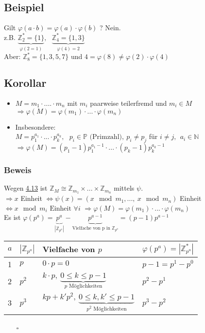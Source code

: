 \documentclass[12pt,titlepage, pdf]{article}
\newcommand{\qed}{\hfill$\square$}
\renewcommand{\>}{\rightarrow}
\renewcommand{\*}{\cdot}
\renewcommand{\phi}{\varphi}
\begin{document}
	\subsection{Beispiel}
	Gilt $\phi (a \cdot b) = \phi(a) \cdot \phi(b)$ ? Nein.\\
	z.B. $\underbrace{\mathds{Z}_2^* = \{1\}}_{\phi(2 = 1)},~~~ \underbrace{\mathds{Z}_4^* = \{1,3\}}_{\phi(4)= 2}$\\
	Aber: $\mathds{Z}_8^* =\{1,3,5,7\}$ und $4 = \phi(8) \neq \phi(2) \cdot \phi(4)$
	\subsection{Korollar}
	\begin{itemize}
		\item$M = m_1 \cdot .... \cdot m_n$ mit $m_i$  paarweise teilerfremd und $m_i \in M$ \\
		$\Rightarrow \phi(M) =\phi(m_1) \cdot ... \cdot \phi(m_n)$
		\item Insbesondere:\\ $M = p_1^{a_1} \cdot... \cdot p_k^{a_k},~~~ p_i \in \mathds{P}\textrm{ (Primzahl)},~ p_i \neq p_j$ für $i \neq j,~~ a_i \in \mathds{N}$\\
		$\Rightarrow \phi(M) = (p_1 - 1)p_1^{a_1 - 1} \cdot ... \cdot (p_k - 1)p_k^{a_k - 1}$
	\end{itemize}
	\subsubsection*{Beweis}
	Wegen \hyperref[4.13]{4.13} ist $\mathds{Z}_M \cong \mathds{Z}_{m_1} \times ... \times \mathds{Z}_{m_n}$ mittels $\psi$.\\
	$\Rightarrow x$ Einheit $\Leftrightarrow \psi(x)=(x\mod m_1,...,~x\mod m_n)$ Einheit\\
	\noindent\hspace*{22mm}$\Leftrightarrow x \mod m_i \text{ Einheit } \forall i$
	$\Rightarrow \phi(M) = \phi(m_1) \cdot ... \cdot \phi(m_n)$\\
	Es ist $\phi(p^a) = \underbrace{p^a}_{|\mathds{Z}_{p^a}|} - \underbrace{p^{a-1}}_{\text{Vielfache von p in }\mathds{Z}_{p^a}} = (p-1)p^{a-1}$ \\
	\begin{tabular}{l | l | l | l }
		$a$ & $|\mathds{Z}_{p^a}|$ & Vielfache von $p$ & $\phi(p^a) = |\mathds{Z}_{p^a}^*|$\\ \hline 
		1 & $p$ & $0 \cdot p = 0$ & $p-1 = p^1 - p^0$ \\
		2 & $p^2$ & $k\cdot p,~ \underbrace{0\leq k \leq p -1}_{p\text{ Möglichkeiten}}$ & $p^2 - p^1$ \\
		3 & $p^3$ & $kp + k'p^2,~ \underbrace{0 \leq k,k' \leq p-1}_{p^2\text{ Möglichkeiten}}$ & $p^3 - p^2$ \\
	\end{tabular}~~~ \qed
\end{document}
